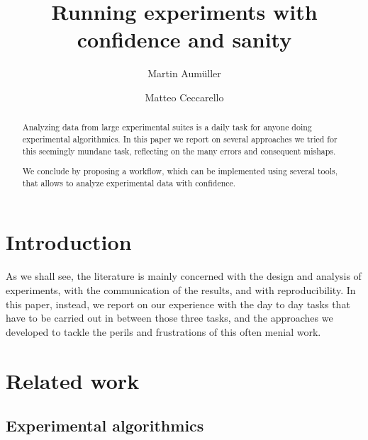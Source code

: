 \documentclass{llncs}
\begin{document}
\title{Running experiments with confidence and sanity}
%
%
\author{
  Martin Aumüller \and
  Matteo Ceccarello}
%
%
%
\maketitle              %
%
\begin{abstract}
Analyzing data from large experimental suites is a daily task for
anyone doing experimental algorithmics.
In this paper we report on several approaches we tried for this 
seemingly mundane task, reflecting on the many errors and consequent
mishaps.

We conclude by proposing a workflow, which can be implemented using several
tools, that allows to analyze experimental data with confidence.

\end{abstract}

\section{Introduction}

As we shall see, the literature is mainly concerned with the design 
and analysis of
experiments, with the communication of the results,
and with reproducibility.
In this paper, instead, we report on our experience with the day to day
tasks that have to be carried out in between those three tasks, and
the approaches we developed to tackle the perils and frustrations of this 
often menial work.

\section{Related work}

\subsection{Experimental algorithmics}
\end{document}

